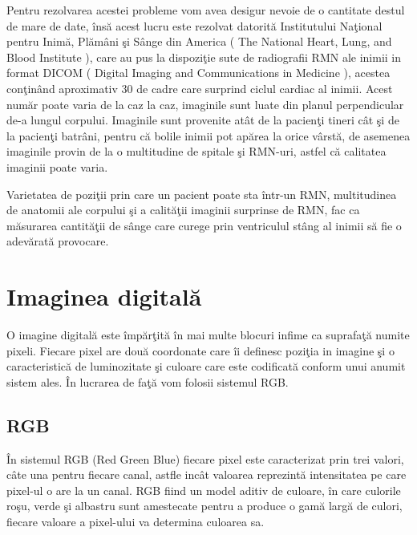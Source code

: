 Pentru rezolvarea acestei probleme vom avea desigur nevoie de o cantitate destul de mare de date, \^{i}ns\u{a} acest lucru este rezolvat datorit\u{a} Institutului Na\c{t}ional pentru Inim\u{a}, Pl\u{a}m\^{a}ni \c{s}i S\^{a}nge din America ( The National Heart, Lung, and Blood Institute ), care au pus la dispozi\c{t}ie sute de radiografii RMN ale inimii in format DICOM ( Digital Imaging and Communications in Medicine ), acestea con\c{t}in\^{a}nd aproximativ 30 de cadre care surprind ciclul cardiac al inimii. Acest num\u{a}r poate varia de la caz la caz, imaginile sunt luate din planul perpendicular de-a lungul corpului. Imaginile sunt provenite at\^{a}t de la pacien\c{t}i tineri c\^{a}t \c{s}i de la pacien\c{t}i batr\^{a}ni, pentru c\u{a} bolile inimii pot ap\u{a}rea la orice v\^{a}rst\u{a}, de asemenea imaginile provin de la o multitudine de spitale \c{s}i RMN-uri, astfel c\u{a} calitatea imaginii poate varia.

\par

Varietatea de pozi\c{t}ii prin care un pacient poate sta \^{i}ntr-un RMN, multitudinea de anatomii ale corpului \c{s}i a calit\u{a}\c{t}ii imaginii surprinse de RMN, fac ca m\u{a}surarea cantit\u{a}\c{t}ii de s\^{a}nge care curege prin ventriculul st\^{a}ng al inimii s\u{a} fie o adev\u{a}rat\u{a} provocare.

\section{Imaginea digital\u{a}}

O imagine digital\u{a} este \^{i}mp\u{a}r\c{t}it\u{a} \^{i}n mai multe blocuri infime ca suprafa\c{t}\u{a} numite pixeli. Fiecare pixel are dou\u{a} coordonate care \^{i}i definesc pozi\c{t}ia in imagine \c{s}i o caracteristic\u{a} de luminozitate \c{s}i culoare care este codificat\u{a} conform unui anumit sistem ales. \^{I}n lucrarea de fa\c{t}\u{a} vom folosii sistemul RGB.

\subsection{RGB}

\^{I}n sistemul RGB (Red Green Blue) fiecare pixel este caracterizat prin trei valori, c\^{a}te una pentru fiecare canal, astfle inc\^{a}t valoarea reprezint\u{a} intensitatea pe care pixel-ul o are la un canal. RGB fiind un model aditiv de culoare, \^{i}n care culorile ro\c{s}u, verde \c{s}i albastru sunt amestecate pentru a produce o gam\u{a} larg\u{a} de culori, fiecare valoare a pixel-ului va determina culoarea sa.

